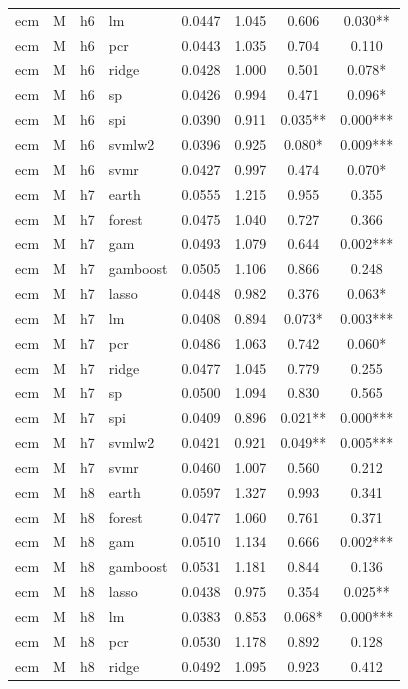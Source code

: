 \begin{ThreePartTable}
\begin{longtable}[t]{llclcccc}
ecm & M & h6 & lm & 0.0447 & 1.045 & 0.606 & 0.030**\\
ecm & M & h6 & pcr & 0.0443 & 1.035 & 0.704 & 0.110\\
ecm & M & h6 & ridge & 0.0428 & 1.000 & 0.501 & 0.078*\\
ecm & M & h6 & sp & 0.0426 & 0.994 & 0.471 & 0.096*\\
ecm & M & h6 & spi & 0.0390 & 0.911 & 0.035** & 0.000***\\
ecm & M & h6 & svmlw2 & 0.0396 & 0.925 & 0.080* & 0.009***\\
ecm & M & h6 & svmr & 0.0427 & 0.997 & 0.474 & 0.070*\\
\addlinespace
ecm & M & h7 & earth & 0.0555 & 1.215 & 0.955 & 0.355\\
ecm & M & h7 & forest & 0.0475 & 1.040 & 0.727 & 0.366\\
ecm & M & h7 & gam & 0.0493 & 1.079 & 0.644 & 0.002***\\
ecm & M & h7 & gamboost & 0.0505 & 1.106 & 0.866 & 0.248\\
ecm & M & h7 & lasso & 0.0448 & 0.982 & 0.376 & 0.063*\\
ecm & M & h7 & lm & 0.0408 & 0.894 & 0.073* & 0.003***\\
ecm & M & h7 & pcr & 0.0486 & 1.063 & 0.742 & 0.060*\\
ecm & M & h7 & ridge & 0.0477 & 1.045 & 0.779 & 0.255\\
ecm & M & h7 & sp & 0.0500 & 1.094 & 0.830 & 0.565\\
ecm & M & h7 & spi & 0.0409 & 0.896 & 0.021** & 0.000***\\
ecm & M & h7 & svmlw2 & 0.0421 & 0.921 & 0.049** & 0.005***\\
ecm & M & h7 & svmr & 0.0460 & 1.007 & 0.560 & 0.212\\
\addlinespace
ecm & M & h8 & earth & 0.0597 & 1.327 & 0.993 & 0.341\\
ecm & M & h8 & forest & 0.0477 & 1.060 & 0.761 & 0.371\\
ecm & M & h8 & gam & 0.0510 & 1.134 & 0.666 & 0.002***\\
ecm & M & h8 & gamboost & 0.0531 & 1.181 & 0.844 & 0.136\\
ecm & M & h8 & lasso & 0.0438 & 0.975 & 0.354 & 0.025**\\
ecm & M & h8 & lm & 0.0383 & 0.853 & 0.068* & 0.000***\\
ecm & M & h8 & pcr & 0.0530 & 1.178 & 0.892 & 0.128\\
ecm & M & h8 & ridge & 0.0492 & 1.095 & 0.923 & 0.412\\

\end{longtable}
\end{ThreePartTable}
